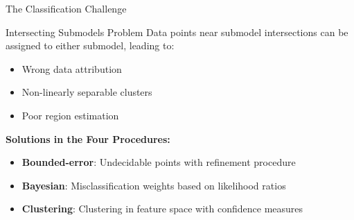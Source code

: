 \documentclass[aspectratio=169]{beamer}
\begin{document}
\begin{frame}{The Classification Challenge}
\begin{center}
\end{center}

\begin{alertblock}{Intersecting Submodels Problem}
Data points near submodel intersections can be assigned to either submodel, leading to:
\begin{itemize}
\item Wrong data attribution
\item Non-linearly separable clusters
\item Poor region estimation
\end{itemize}
\end{alertblock}

\textbf{Solutions in the Four Procedures:}
\begin{itemize}
\item \textbf{Bounded-error}: Undecidable points with refinement procedure
\item \textbf{Bayesian}: Misclassification weights based on likelihood ratios
\item \textbf{Clustering}: Clustering in feature space with confidence measures
\end{itemize}
\end{frame}
\end{document}
